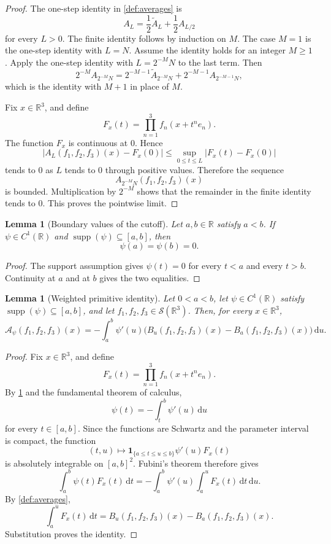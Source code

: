 \documentclass[11pt]{article}
\newtheorem{lemma}[theorem]{Lemma}
\newcommand{\R}{\mathbb{R}}
\newcommand{\Sch}{\mathcal{S}}
\newcommand{\supp}{\operatorname{supp}}
\newcommand{\A}{\mathcal{A}}
\newcommand{\dd}{\,\mathrm{d}}
\newcommand{\one}{\mathbf{1}}
\newcommand{\abs}[1]{\left|#1\right|}
\begin{document}
	\begin{proof}
		The one-step identity in \cref{def:averages} is
		\[
		A_L
		=
		\frac12\widetilde A_L+\frac12A_{L/2}
		\]
		for every \(L>0\).  The finite identity follows by induction on \(M\).  The case \(M=1\) is the one-step identity with \(L=N\).  Assume the identity holds for an integer \(M\geq1\).  Apply the one-step identity with \(L=2^{-M}N\) to the last term.  Then
		\[
		2^{-M}A_{2^{-M}N}
		=
		2^{-M-1}\widetilde A_{2^{-M}N}
		+
		2^{-M-1}A_{2^{-M-1}N},
		\]
		which is the identity with \(M+1\) in place of \(M\).
		
		Fix \(x\in\R^3\), and define
		\[
		F_x(t)=\prod_{n=1}^{3}f_n(x+t^n e_n).
		\]
		The function \(F_x\) is continuous at \(0\).  Hence
		\[
		\abs{A_L(f_1,f_2,f_3)(x)-F_x(0)}
		\leq
		\sup_{0\leq t\leq L}\abs{F_x(t)-F_x(0)}
		\]
		tends to \(0\) as \(L\) tends to \(0\) through positive values.  Therefore the sequence
		\[
		A_{2^{-M}N}(f_1,f_2,f_3)(x)
		\]
		is bounded.  Multiplication by \(2^{-M}\) shows that the remainder in the finite identity tends to \(0\).  This proves the pointwise limit.
	\end{proof}
	
	\begin{lemma}[Boundary values of the cutoff]\label{lem:cutoff-boundary}
		Let \(a,b\in\R\) satisfy \(a<b\).  If \(\psi\in C^1(\R)\) and \(\supp(\psi)\subseteq[a,b]\), then
		\[
		\psi(a)=\psi(b)=0.
		\]
	\end{lemma}
	
	\begin{proof}
		The support assumption gives \(\psi(t)=0\) for every \(t<a\) and every \(t>b\).  Continuity at \(a\) and at \(b\) gives the two equalities.
	\end{proof}
	
	\begin{lemma}[Weighted primitive identity]\label{lem:weighted-primitive-identity}
		Let \(0<a<b\), let \(\psi\in C^1(\R)\) satisfy \(\supp(\psi)\subseteq[a,b]\), and let \(f_1,f_2,f_3\in\Sch(\R^3)\).  Then, for every \(x\in\R^3\),
		\[
		\A_\psi(f_1,f_2,f_3)(x)
		=
		-\int_a^b\psi'(u)\bigl(B_u(f_1,f_2,f_3)(x)-B_a(f_1,f_2,f_3)(x)\bigr)\dd u.
		\]
	\end{lemma}
	
	\begin{proof}
		Fix \(x\in\R^3\), and define
		\[
		F_x(t)=\prod_{n=1}^{3}f_n(x+t^n e_n).
		\]
		By \cref{lem:cutoff-boundary} and the fundamental theorem of calculus,
		\[
		\psi(t)=-\int_t^b\psi'(u)\dd u
		\]
		for every \(t\in[a,b]\).  Since the functions are Schwartz and the parameter interval is compact, the function
		\[
		(t,u)\longmapsto\one_{\{a\leq t\leq u\leq b\}}\psi'(u)F_x(t)
		\]
		is absolutely integrable on \([a,b]^2\).  Fubini's theorem therefore gives
		\[
		\int_a^b\psi(t)F_x(t)\dd t
		=
		-\int_a^b\psi'(u)\int_a^uF_x(t)\dd t\dd u.
		\]
		By \cref{def:averages},
		\[
		\int_a^uF_x(t)\dd t=B_u(f_1,f_2,f_3)(x)-B_a(f_1,f_2,f_3)(x).
		\]
		Substitution proves the identity.
	\end{proof}
	
\end{document}
